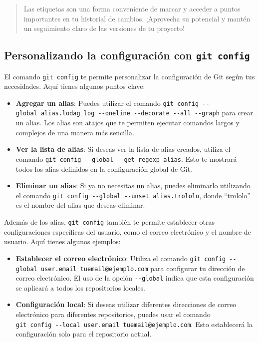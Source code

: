 \documentclass[
  a4paper,
]{article}
\begin{document}
\begin{quote}
Las etiquetas son una forma conveniente de marcar y acceder a puntos
importantes en tu historial de cambios. ¡Aprovecha su potencial y mantén
un seguimiento claro de las versiones de tu proyecto!
\end{quote}

\subsection{\texorpdfstring{Personalizando la configuración con
\texttt{git\ config}}{Personalizando la configuración con git config}}\label{personalizando-la-configuraciuxf3n-con-git-config}

El comando \texttt{git\ config} te permite personalizar la configuración
de Git según tus necesidades. Aquí tienes algunos puntos clave:

\begin{itemize}
\item
  \textbf{Agregar un alias}: Puedes utilizar el comando
  \texttt{git\ config\ -\/-global\ alias.lodag\ \textquotesingle{}log\ -\/-oneline\ -\/-decorate\ -\/-all\ -\/-graph\textquotesingle{}}
  para crear un alias. Los alias son atajos que te permiten ejecutar
  comandos largos y complejos de una manera más sencilla.
\item
  \textbf{Ver la lista de alias}: Si deseas ver la lista de alias
  creados, utiliza el comando
  \texttt{git\ config\ -\/-global\ -\/-get-regexp\ alias}. Esto te
  mostrará todos los alias definidos en la configuración global de Git.
\item
  \textbf{Eliminar un alias}: Si ya no necesitas un alias, puedes
  eliminarlo utilizando el comando
  \texttt{git\ config\ -\/-global\ -\/-unset\ alias.trololo}, donde
  ``trololo'' es el nombre del alias que deseas eliminar.
\end{itemize}

Además de los alias, \texttt{git\ config} también te permite establecer
otras configuraciones específicas del usuario, como el correo
electrónico y el nombre de usuario. Aquí tienes algunos ejemplos:

\begin{itemize}
\item
  \textbf{Establecer el correo electrónico}: Utiliza el comando
  \texttt{git\ config\ -\/-global\ user.email\ tuemail@ejemplo.com} para
  configurar tu dirección de correo electrónico. El uso de la opción
  \texttt{-\/-global} indica que esta configuración se aplicará a todos
  los repositorios locales.
\item
  \textbf{Configuración local}: Si deseas utilizar diferentes
  direcciones de correo electrónico para diferentes repositorios, puedes
  usar el comando
  \texttt{git\ config\ -\/-local\ user.email\ tuemail@ejemplo.com}. Esto
  establecerá la configuración solo para el repositorio actual.
\end{itemize}
\end{document}
